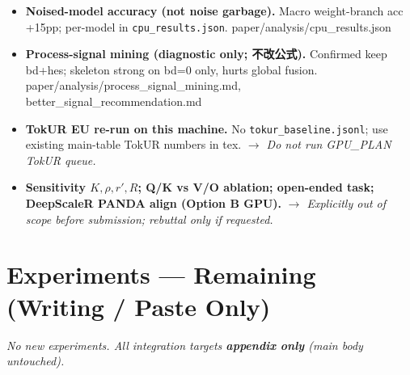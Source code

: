 \documentclass[11pt]{article}
\newcommand{\done}{\item[\textcolor{donecolor}{$\boxtimes$}]}
\newcommand{\skipdone}{\item[\textcolor{skipcolor}{$\boxminus$}]}
\newcommand{\fixnote}[1]{\newline\textcolor{p2}{\itshape $\rightarrow$ #1}}
\newcommand{\datapath}[1]{\newline\textcolor{donecolor}{\small\ttfamily #1}}
\begin{document}
\begin{itemize}
  \done \textbf{Noised-model accuracy (not noise garbage).}
        Macro weight-branch acc +15pp; per-model in \texttt{cpu\_results.json}.
        \datapath{paper/analysis/cpu\_results.json}

  \done \textbf{Process-signal mining (diagnostic only; \textbf{不改公式}).}
        Confirmed keep bd+hes; skeleton strong on bd=0 only, hurts global fusion.
        \datapath{paper/analysis/process\_signal\_mining.md, better\_signal\_recommendation.md}

  \skipdone \textbf{TokUR EU re-run on this machine.}
        No \texttt{tokur\_baseline.jsonl}; use existing main-table TokUR numbers in tex.
        \fixnote{Do not run GPU\_PLAN TokUR queue.}

  \skipdone \textbf{Sensitivity $K,\rho,r',R$; Q/K vs V/O ablation; open-ended task; DeepScaleR PANDA align (Option B GPU).}
        \fixnote{Explicitly out of scope before submission; rebuttal only if requested.}
\end{itemize}

\section{Experiments --- Remaining (Writing / Paste Only)}
\textit{No new experiments. All integration targets \textbf{appendix only} (main body untouched).}
\end{document}
